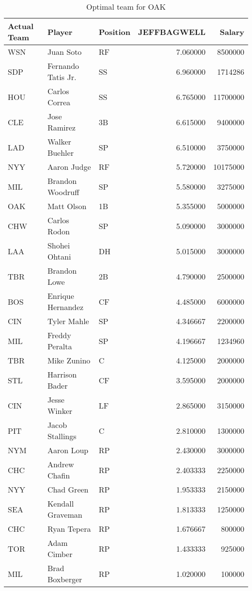 \begin{table}

\caption{Optimal team for OAK}
\centering
\begin{tabular}[t]{l|l|l|r|r}
\hline
Actual Team & Player & Position & JEFFBAGWELL & Salary\\
\hline
WSN & Juan Soto & RF & 7.060000 & 8500000\\
\hline
SDP & Fernando Tatis Jr. & SS & 6.960000 & 1714286\\
\hline
HOU & Carlos Correa & SS & 6.765000 & 11700000\\
\hline
CLE & Jose Ramirez & 3B & 6.615000 & 9400000\\
\hline
LAD & Walker Buehler & SP & 6.510000 & 3750000\\
\hline
NYY & Aaron Judge & RF & 5.720000 & 10175000\\
\hline
MIL & Brandon Woodruff & SP & 5.580000 & 3275000\\
\hline
OAK & Matt Olson & 1B & 5.355000 & 5000000\\
\hline
CHW & Carlos Rodon & SP & 5.090000 & 3000000\\
\hline
LAA & Shohei Ohtani & DH & 5.015000 & 3000000\\
\hline
TBR & Brandon Lowe & 2B & 4.790000 & 2500000\\
\hline
BOS & Enrique Hernandez & CF & 4.485000 & 6000000\\
\hline
CIN & Tyler Mahle & SP & 4.346667 & 2200000\\
\hline
MIL & Freddy Peralta & SP & 4.196667 & 1234960\\
\hline
TBR & Mike Zunino & C & 4.125000 & 2000000\\
\hline
STL & Harrison Bader & CF & 3.595000 & 2000000\\
\hline
CIN & Jesse Winker & LF & 2.865000 & 3150000\\
\hline
PIT & Jacob Stallings & C & 2.810000 & 1300000\\
\hline
NYM & Aaron Loup & RP & 2.430000 & 3000000\\
\hline
CHC & Andrew Chafin & RP & 2.403333 & 2250000\\
\hline
NYY & Chad Green & RP & 1.953333 & 2150000\\
\hline
SEA & Kendall Graveman & RP & 1.813333 & 1250000\\
\hline
CHC & Ryan Tepera & RP & 1.676667 & 800000\\
\hline
TOR & Adam Cimber & RP & 1.433333 & 925000\\
\hline
MIL & Brad Boxberger & RP & 1.020000 & 100000\\
\hline
\end{tabular}
\end{table}
